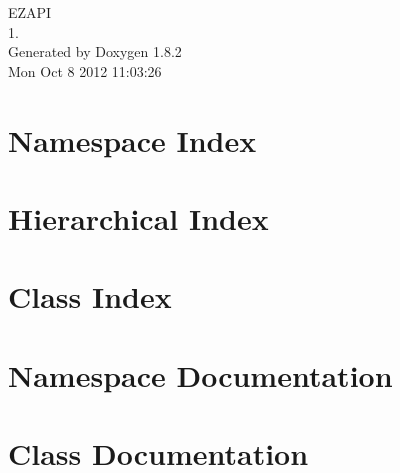 \documentclass{book}
\begin{document}
\hypersetup{pageanchor=false,citecolor=blue}
\begin{titlepage}
\vspace*{7cm}
\begin{center}
{\Large E\-Z\-A\-P\-I \\[1ex]\large 1. }\\
\vspace*{1cm}
{\large Generated by Doxygen 1.8.2}\\
\vspace*{0.5cm}
{\small Mon Oct 8 2012 11:03:26}\\
\end{center}
\end{titlepage}
\clearemptydoublepage
{}
\tableofcontents
\clearemptydoublepage
{}
\hypersetup{pageanchor=true,citecolor=blue}
\chapter{Namespace Index}

\chapter{Hierarchical Index}

\chapter{Class Index}

\chapter{Namespace Documentation}



\chapter{Class Documentation}












\printindex
\end{document}
